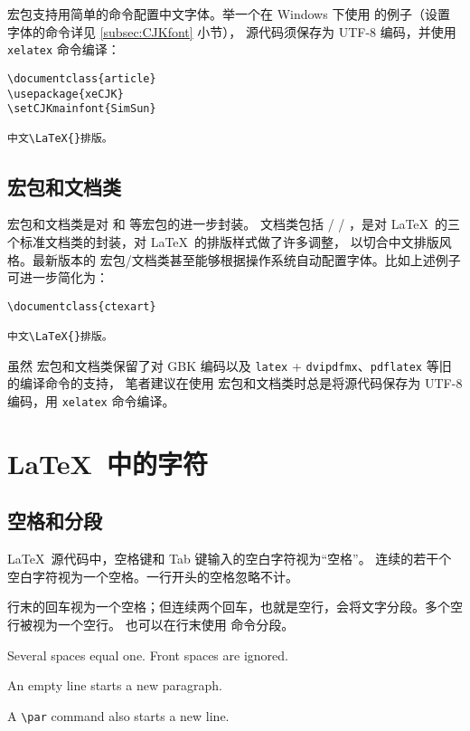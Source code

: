  宏包支持用简单的命令配置中文字体。举一个在 Windows 下使用  的例子（设置字体的命令详见 \ref{subsec:CJKfont} 小节），
源代码须保存为 UTF-8 编码，并使用 \texttt{xelatex} 命令编译：
\begin{verbatim}
\documentclass{article}
\usepackage{xeCJK}
\setCJKmainfont{SimSun}

中文\LaTeX{}排版。

\end{verbatim}

\subsection{ 宏包和文档类}\label{subsec:ctex}

 宏包和文档类是对  和  等宏包的进一步封装。 文档类包括
 /  / ，是对 \LaTeX\ 的三个标准文档类的封装，对 \LaTeX\ 的排版样式做了许多调整，
以切合中文排版风格。最新版本的  宏包/文档类甚至能够根据操作系统自动配置字体。比如上述例子可进一步简化为：
\begin{verbatim}
\documentclass{ctexart}

中文\LaTeX{}排版。

\end{verbatim}

虽然  宏包和文档类保留了对 GBK 编码以及 \texttt{latex} + \texttt{dvipdfmx}、\texttt{pdflatex} 等旧的编译命令的支持，
笔者建议在使用  宏包和文档类时总是将源代码保存为 UTF-8 编码，用 \texttt{xelatex} 命令编译。

\section{\LaTeX\ 中的字符}\label{sec:text-symbols}

\subsection{空格和分段}\label{subsec:spaces}

\LaTeX\ 源代码中，空格键和 Tab 键输入的空白字符视为“空格”。
连续的若干个空白字符视为一个空格。一行开头的空格忽略不计。

行末的回车视为一个空格；但连续两个回车，也就是空行，会将文字分段。多个空行被视为一个空行。
也可以在行末使用  命令分段。
\begin{example}
Several spaces     equal one.
  Front spaces are ignored.

An empty line starts a new
paragraph.\par
A \verb|\par| command also 
starts a new line.
\end{example}

